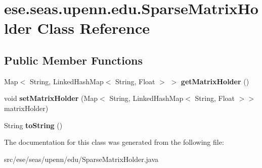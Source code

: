 \hypertarget{classese_1_1seas_1_1upenn_1_1edu_1_1_sparse_matrix_holder}{}\section{ese.\+seas.\+upenn.\+edu.\+Sparse\+Matrix\+Holder Class Reference}
\label{classese_1_1seas_1_1upenn_1_1edu_1_1_sparse_matrix_holder}
\subsection*{Public Member Functions}
\begin{DoxyCompactItemize}
\item 
\hypertarget{classese_1_1seas_1_1upenn_1_1edu_1_1_sparse_matrix_holder_af4939e0fb08c94f4449078f520bdede6}{}Map$<$ String, Linked\+Hash\+Map$<$ String, Float $>$ $>$ {\bfseries get\+Matrix\+Holder} ()\label{classese_1_1seas_1_1upenn_1_1edu_1_1_sparse_matrix_holder_af4939e0fb08c94f4449078f520bdede6}

\item 
\hypertarget{classese_1_1seas_1_1upenn_1_1edu_1_1_sparse_matrix_holder_a20d7d37cfc84fb9468a1581a4f1168e0}{}void {\bfseries set\+Matrix\+Holder} (Map$<$ String, Linked\+Hash\+Map$<$ String, Float $>$$>$ matrix\+Holder)\label{classese_1_1seas_1_1upenn_1_1edu_1_1_sparse_matrix_holder_a20d7d37cfc84fb9468a1581a4f1168e0}

\item 
\hypertarget{classese_1_1seas_1_1upenn_1_1edu_1_1_sparse_matrix_holder_aa236d3257451a1d086fb069abc0a1e32}{}String {\bfseries to\+String} ()\label{classese_1_1seas_1_1upenn_1_1edu_1_1_sparse_matrix_holder_aa236d3257451a1d086fb069abc0a1e32}

\end{DoxyCompactItemize}


The documentation for this class was generated from the following file\+:\begin{DoxyCompactItemize}
\item 
src/ese/seas/upenn/edu/Sparse\+Matrix\+Holder.\+java\end{DoxyCompactItemize}
